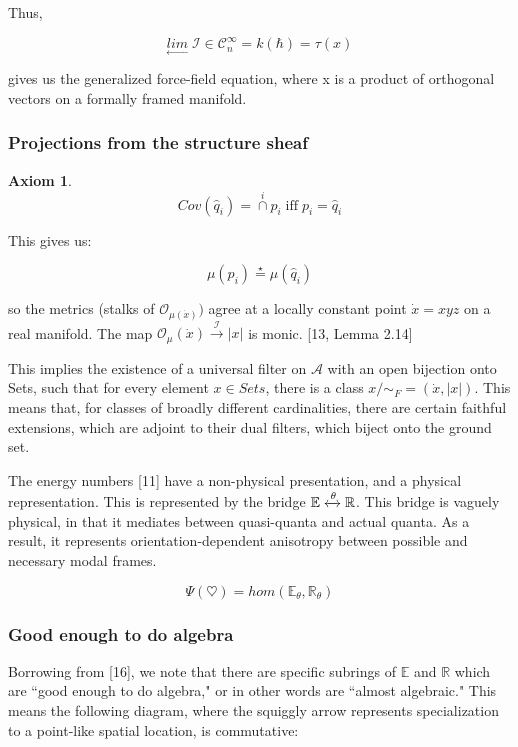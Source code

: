 \documentclass{article}
\newtheorem{ax}{Axiom}
\begin{document}
		Thus, 
		
		$$\underset{\longleftarrow}{lim}\; \mathcal{I} \in \mathcal{C}_n^\infty = k(\hbar) = \tau(x)$$
		
		gives us the generalized force-field equation, where x is a product of orthogonal vectors on a formally framed manifold.
		\subsubsection{Projections from the structure sheaf}
		
		\begin{ax}
		$$Cov(\hat{q}_i) = \overset{i}{\cap}p_i \; \text{iff} \; p_i = \hat{q}_i$$ 
		\end{ax}
		
		This gives us:
		
		$$\mu(p_i) \overset{\star}{=} \mu(\hat{q}_i)$$
		
		so the metrics (stalks of $\mathcal{O}_{\mu(\dot{x})})$ agree at a locally constant point $\dot{x} = xyz$ on a real manifold. The map $\mathcal{O}_\mu(\dot{x}) \xrightarrow{\mathcal{I}} |x|$ is monic. [13, Lemma 2.14]
		
		This implies the existence of a universal filter on $\mathscr{A}$ with an open bijection onto Sets, such that for every element $x\in Sets$, there is a class $x/\sim_F=(\dot{x},|x|)$. This means that, for classes of broadly different cardinalities, there are certain faithful extensions, which are adjoint to their dual filters, which biject onto the ground set.
		
		The energy numbers [11] have a non-physical presentation, and a physical representation. This is represented by the bridge $\mathbb{E}\xleftrightarrow{\theta}\mathbb{R}$. This bridge is vaguely physical, in that it mediates between quasi-quanta and actual quanta. As a result, it represents orientation-dependent anisotropy between possible and necessary modal frames. 
		
		$$\Psi(\heartsuit) = hom(\mathbb{E}_\theta,\mathbb{R}_\theta)$$
		
		\subsubsection{Good enough to do algebra}
		Borrowing from [16], we note that there are specific subrings of $\mathbb{E}$ and $\mathbb{R}$ which are ``good enough to do algebra," or in other words are ``almost algebraic." This means the following diagram, where the squiggly arrow represents specialization to a point-like spatial location, is commutative:
		
\end{document}
